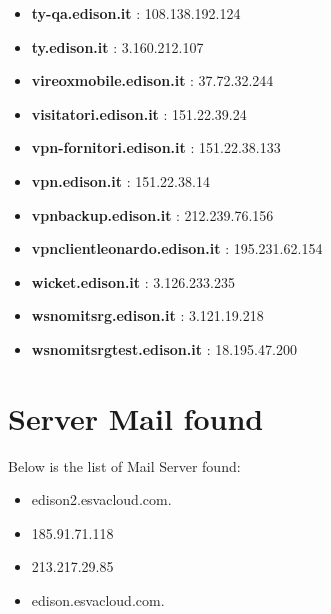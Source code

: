 \documentclass{article}
\begin{document}
\begin{itemize}
            \item \textbf{ ty-qa.edison.it }: 108.138.192.124
        
            \item \textbf{ ty.edison.it }: 3.160.212.107
        
            \item \textbf{ vireoxmobile.edison.it }: 37.72.32.244
        
            \item \textbf{ visitatori.edison.it }: 151.22.39.24
        
            \item \textbf{ vpn-fornitori.edison.it }: 151.22.38.133
        
            \item \textbf{ vpn.edison.it }: 151.22.38.14
        
            \item \textbf{ vpnbackup.edison.it }: 212.239.76.156
        
            \item \textbf{ vpnclientleonardo.edison.it }: 195.231.62.154
        
            \item \textbf{ wicket.edison.it }: 3.126.233.235
        
            \item \textbf{ wsnomitsrg.edison.it }: 3.121.19.218
        
            \item \textbf{ wsnomitsrgtest.edison.it }: 18.195.47.200
        
    
\end{itemize}

\clearpage

\section{Server Mail found}

Below is the list of Mail Server found:

\begin{itemize}
    
        
            \item edison2.esvacloud.com.
        
            \item 185.91.71.118
        
            \item 213.217.29.85
        
            \item edison.esvacloud.com.
        
    
\end{itemize}
\end{document}
